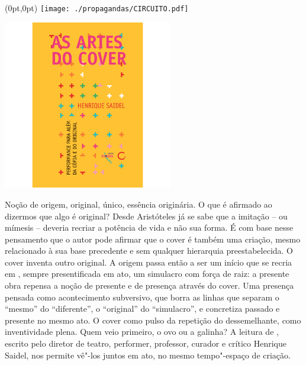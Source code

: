\pagestyle{circuito}
\label{circuito}

\begin{textblock*}{5.625in}(0pt,0pt)%
\vspace*{-3.5cm}
\hspace*{-2.77cm}\texttt{[image: ./propagandas/CIRCUITO.pdf]}
\end{textblock*}

\pagebreak %


\begin{center}
\hspace*{-3.6cm}
\hspace*{3.1cm}\includegraphics[width=74mm]{./grid/cover.jpg}
\end{center}

\hspace*{-7cm}\hrulefill\hspace*{-7cm}

\medskip

\noindent{}Noção de origem, original, único, essência originária. O que é afirmado ao dizermos que algo é original? Desde Aristóteles já se sabe que a imitação – ou mímesis – deveria recriar a potência de vida e não sua forma. É com base nesse pensamento que o autor pode afirmar que o cover é também uma criação, mesmo relacionado à sua base precedente e sem qualquer hierarquia preestabelecida. O cover inventa outro original.
A origem passa então a ser um início que se recria em {}, sempre presentificada em ato, um simulacro com força de raiz: a presente obra repensa a noção de presente e de presença através do cover. Uma presença pensada como acontecimento subversivo, que borra as linhas que separam o “mesmo” do “diferente”, o “original” do “simulacro”, e concretiza passado e presente no mesmo ato. O cover como pulso da repetição do dessemelhante, como inventividade plena. Quem veio primeiro, o ovo ou a galinha? A leitura de {}, escrito pelo diretor de teatro, performer, professor, curador e crítico Henrique Saidel, nos permite vê"-los juntos em ato, no mesmo tempo"-espaço de criação.

